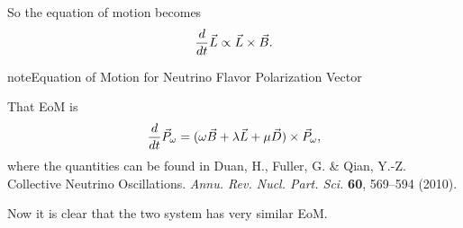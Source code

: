 \documentclass[letterpaper,12pt,english]{sphinxmanual}
\begin{document}
So the equation of motion becomes
\begin{gather}
\begin{split}\frac{d}{dt}\vec L \propto \vec L \times \vec B.\end{split}\notag
\end{gather}
\begin{notice}{note}{Equation of Motion for Neutrino Flavor Polarization Vector}

That EoM is
\begin{gather}
\begin{split}\frac{d}{dt} \vec P_\omega = (\omega \vec B + \lambda \vec L + \mu \vec D)\times \vec P_\omega ,\end{split}\notag
\end{gather}
where the quantities can be found in Duan, H., Fuller, G. \& Qian, Y.-Z. Collective Neutrino Oscillations. \emph{Annu. Rev. Nucl. Part. Sci.} \textbf{60}, 569–594 (2010).

Now it is clear that the two system has very similar EoM.
\end{notice}
\end{document}
